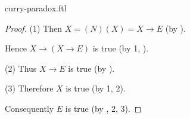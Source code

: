 \documentclass{stex}
\newcommand{\app}[2]{(#1)(#2)}
\begin{document}
\begin{smodule}{curry-paradox.ftl}
\begin{forthel}
\begin{proof}
    (1) Then $X = \app{N}{X} = X \rightarrow E$ (by ).

    Hence $X \rightarrow (X \rightarrow E)$ is true (by 1, ).

    (2) Thus $X \rightarrow E$ is true (by ).

    (3) Therefore $X$ is true (by 1, 2).

    Consequently $E$ is true (by , 2, 3).
  \end{proof}
\end{forthel}

\printbibliography
{}
\end{smodule}
\end{document}
